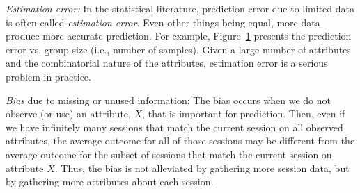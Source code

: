 \begin{packedenumerate}
  \item \emph{Estimation error:} In the statistical literature, prediction error due to limited data is often called {\it estimation error}.  Even other things being equal, more data produce more accurate prediction. For example, Figure~\ref{fig:group-size-impact} presents the prediction error vs. group size (i.e., number of samples). Given a large number of attributes and the combinatorial nature of the attributes, estimation error is a serious problem in practice. 

\begin{figure}[h!]
\centering
{}
\label{fig:group-size-impact}
\end{figure}

\item \emph{Bias} due to missing or unused information: The bias occurs when we do not observe (or use) an attribute, $X$, that is important for prediction. Then, even if we have infinitely many sessions that match the current session on all observed attributes, the average outcome for all of those sessions may be different from the average outcome for the subset of sessions that match the current session on attribute $X$.  Thus, the bias is not alleviated by gathering more session data, but by gathering more attributes about each session.


\end{packedenumerate}
